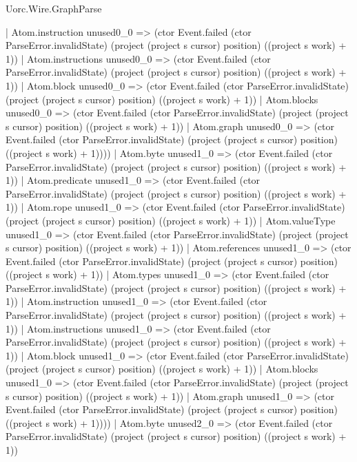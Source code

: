 \begin{lexlean}{Uorc.Wire.GraphParse}
\begin{semanticmodule}
{                      | Atom.instruction unused0_0 => (ctor Event.failed (ctor ParseError.invalidState) (project (project s cursor) position) ((project s work) + 1))
                      | Atom.instructions unused0_0 => (ctor Event.failed (ctor ParseError.invalidState) (project (project s cursor) position) ((project s work) + 1))
                      | Atom.block unused0_0 => (ctor Event.failed (ctor ParseError.invalidState) (project (project s cursor) position) ((project s work) + 1))
                      | Atom.blocks unused0_0 => (ctor Event.failed (ctor ParseError.invalidState) (project (project s cursor) position) ((project s work) + 1))
                      | Atom.graph unused0_0 => (ctor Event.failed (ctor ParseError.invalidState) (project (project s cursor) position) ((project s work) + 1))))
                  | Atom.byte unused1_0 => (ctor Event.failed (ctor ParseError.invalidState) (project (project s cursor) position) ((project s work) + 1))
                  | Atom.predicate unused1_0 => (ctor Event.failed (ctor ParseError.invalidState) (project (project s cursor) position) ((project s work) + 1))
                  | Atom.rope unused1_0 => (ctor Event.failed (ctor ParseError.invalidState) (project (project s cursor) position) ((project s work) + 1))
                  | Atom.valueType unused1_0 => (ctor Event.failed (ctor ParseError.invalidState) (project (project s cursor) position) ((project s work) + 1))
                  | Atom.references unused1_0 => (ctor Event.failed (ctor ParseError.invalidState) (project (project s cursor) position) ((project s work) + 1))
                  | Atom.types unused1_0 => (ctor Event.failed (ctor ParseError.invalidState) (project (project s cursor) position) ((project s work) + 1))
                  | Atom.instruction unused1_0 => (ctor Event.failed (ctor ParseError.invalidState) (project (project s cursor) position) ((project s work) + 1))
                  | Atom.instructions unused1_0 => (ctor Event.failed (ctor ParseError.invalidState) (project (project s cursor) position) ((project s work) + 1))
                  | Atom.block unused1_0 => (ctor Event.failed (ctor ParseError.invalidState) (project (project s cursor) position) ((project s work) + 1))
                  | Atom.blocks unused1_0 => (ctor Event.failed (ctor ParseError.invalidState) (project (project s cursor) position) ((project s work) + 1))
                  | Atom.graph unused1_0 => (ctor Event.failed (ctor ParseError.invalidState) (project (project s cursor) position) ((project s work) + 1))))
              | Atom.byte unused2_0 => (ctor Event.failed (ctor ParseError.invalidState) (project (project s cursor) position) ((project s work) + 1))
}
\end{semanticmodule}
\end{lexlean}
